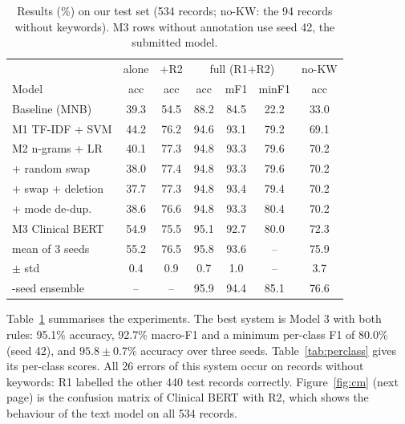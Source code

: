 \documentclass[twocolumn,10pt]{article}
\begin{document}
\begin{table}[t]
\centering
\footnotesize\setlength{\tabcolsep}{2.1pt}
\begin{tabular}{lcccccc}
\toprule
 & alone & +R2 & \multicolumn{3}{c}{full (R1+R2)} & no-KW \\
Model & acc & acc & acc & mF1 & minF1 & acc \\
\midrule
Baseline (MNB) & 39.3 & 54.5 & 88.2 & 84.5 & 22.2 & 33.0 \\
M1 TF-IDF + SVM & 44.2 & 76.2 & 94.6 & 93.1 & 79.2 & 69.1 \\
M2 n-grams + LR & 40.1 & 77.3 & 94.8 & 93.3 & 79.6 & 70.2 \\
\quad + random swap & 38.0 & 77.4 & 94.8 & 93.3 & 79.6 & 70.2 \\
\quad + swap + deletion & 37.7 & 77.3 & 94.8 & 93.4 & 79.4 & 70.2 \\
\quad + mode de-dup. & 38.6 & 76.6 & 94.8 & 93.3 & 80.4 & 70.2 \\
M3 Clinical BERT & 54.9 & 75.5 & 95.1 & 92.7 & 80.0 & 72.3 \\
\quad mean of 3 seeds & 55.2 & 76.5 & 95.8 & 93.6 & -- & 75.9 \\
\quad $\pm$ std & 0.4 & 0.9 & 0.7 & 1.0 & -- & 3.7 \\
\quad 3-seed ensemble & -- & -- & 95.9 & 94.4 & 85.1 & 76.6 \\
\bottomrule
\end{tabular}
\caption{Results (\%) on our test set (534 records; no-KW: the 94 records without keywords). M3 rows without annotation use seed 42, the submitted model.}
\label{tab:results}
\end{table}

\noindent Table~\ref{tab:results} summarises the experiments. The best system is Model 3 with both rules: 95.1\% accuracy, 92.7\% macro-F1 and a minimum per-class F1 of 80.0\% (seed 42), and $95.8 \pm 0.7\%$ accuracy over three seeds. Table~\ref{tab:perclass} gives its per-class scores. All 26 errors of this system occur on records without keywords: R1 labelled the other 440 test records correctly. Figure~\ref{fig:cm} (next page) is the confusion matrix of Clinical BERT with R2, which shows the behaviour of the text model on all 534 records.
\end{document}
